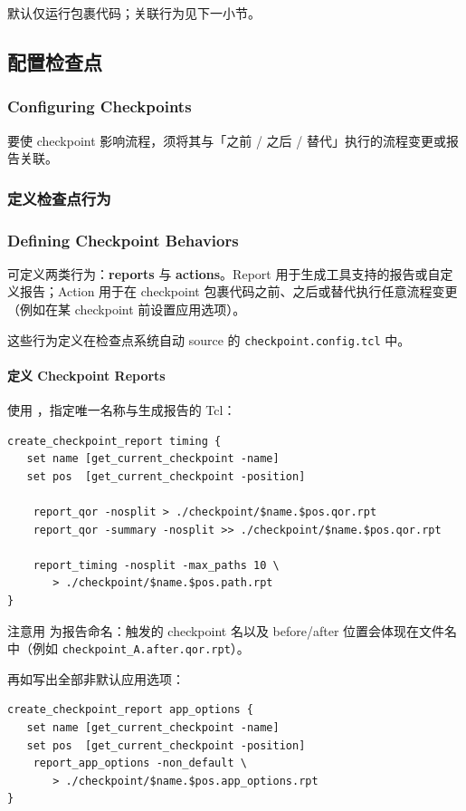 默认仅运行包裹代码；关联行为见下一小节。

\subsection{配置检查点}
\subsubsection*{Configuring Checkpoints}

要使 checkpoint 影响流程，须将其与「之前 / 之后 / 替代」执行的流程变更或报告关联。

\subsubsection{定义检查点行为}
\subsubsection*{Defining Checkpoint Behaviors}

可定义两类行为：\textbf{reports} 与 \textbf{actions}。Report 用于生成工具支持的报告或自定义报告；Action 用于在 checkpoint 包裹代码之前、之后或替代执行任意流程变更（例如在某 checkpoint 前设置应用选项）。

这些行为定义在检查点系统自动 source 的 \texttt{checkpoint.config.tcl} 中。

\paragraph{定义 Checkpoint Reports}
使用 ，指定唯一名称与生成报告的 Tcl：
\begin{lstlisting}
create_checkpoint_report timing {
   set name [get_current_checkpoint -name]
   set pos  [get_current_checkpoint -position]

    report_qor -nosplit > ./checkpoint/$name.$pos.qor.rpt
    report_qor -summary -nosplit >> ./checkpoint/$name.$pos.qor.rpt

    report_timing -nosplit -max_paths 10 \
       > ./checkpoint/$name.$pos.path.rpt
}
\end{lstlisting}

注意用  为报告命名：触发的 checkpoint 名以及 before/after 位置会体现在文件名中（例如 \texttt{checkpoint\_A.after.qor.rpt}）。

再如写出全部非默认应用选项：
\begin{lstlisting}
create_checkpoint_report app_options {
   set name [get_current_checkpoint -name]
   set pos  [get_current_checkpoint -position]
    report_app_options -non_default \
       > ./checkpoint/$name.$pos.app_options.rpt
}
\end{lstlisting}

